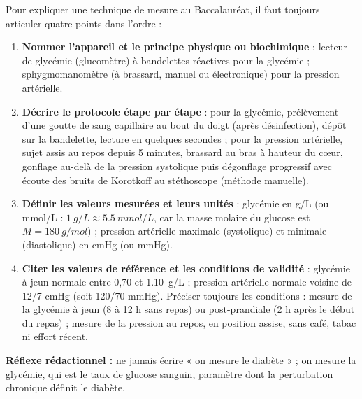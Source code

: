 \documentclass[11pt]{article}
\newcommand{\cle}[1]{{\popxbold\color{popdark}#1}}
\begin{document}
\begin{methode}
Pour expliquer une technique de mesure au Baccalauréat, il faut toujours articuler quatre points dans l'ordre :
\begin{enumerate}
\item \textbf{Nommer l'appareil et le principe physique ou biochimique} : lecteur de glycémie (glucomètre) à bandelettes réactives pour la glycémie ; sphygmomanomètre (à brassard, manuel ou électronique) pour la pression artérielle.
\item \textbf{Décrire le protocole étape par étape} : pour la glycémie, prélèvement d'une goutte de sang capillaire au bout du doigt (après désinfection), dépôt sur la bandelette, lecture en quelques secondes ; pour la pression artérielle, sujet assis au repos depuis 5 minutes, brassard au bras à hauteur du c\oe ur, gonflage au-delà de la pression systolique puis dégonflage progressif avec écoute des bruits de Korotkoff au stéthoscope (méthode manuelle).
\item \textbf{Définir les valeurs mesurées et leurs unités} : glycémie en g/L (ou mmol/L : $\SI{1}{g/L} \approx \SI{5,5}{mmol/L}$, car la masse molaire du glucose est $M = \SI{180}{g/mol}$) ; pression artérielle maximale (systolique) et minimale (diastolique) en cmHg (ou mmHg).
\item \textbf{Citer les valeurs de référence et les conditions de validité} : glycémie à jeun normale entre 0,70 et \SI{1,10}{g/L} ; pression artérielle normale voisine de 12/7 cmHg (soit 120/70 mmHg). Préciser toujours les conditions : mesure de la glycémie à jeun (8 à 12 h sans repas) ou post-prandiale (2 h après le début du repas) ; mesure de la pression au repos, en position assise, sans café, tabac ni effort récent.
\end{enumerate}
\textbf{Réflexe rédactionnel :} ne jamais écrire « on mesure le diabète » ; on mesure la \cle{glycémie}, qui est le taux de glucose sanguin, paramètre dont la perturbation chronique définit le diabète.
\end{methode}
\end{document}
